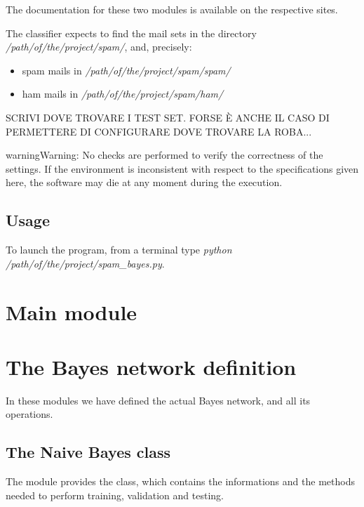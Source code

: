 \documentclass[letterpaper,10pt,english]{sphinxmanual}
\begin{document}
The documentation for these two modules is available on the respective sites.

The classifier expects to find the mail sets in the directory \emph{/path/of/the/project/spam/}, and, precisely:
\begin{itemize}
\item {} 
spam mails in \emph{/path/of/the/project/spam/spam/}

\item {} 
ham mails in \emph{/path/of/the/project/spam/ham/}

\end{itemize}

SCRIVI DOVE TROVARE I TEST SET. FORSE È ANCHE IL CASO DI PERMETTERE DI CONFIGURARE DOVE TROVARE LA ROBA...

\begin{notice}{warning}{Warning:}
No checks are performed to verify the correctness of the settings. If the environment is inconsistent with respect to the specifications given here, the software may die at any moment during the execution.
\end{notice}


\section{Usage}
\label{index:usage}
To launch the program, from a terminal type
\emph{python /path/of/the/project/spam\_bayes.py}.


\chapter{Main module}
\label{index:module-spam_bayes}\label{index:main-module}

\chapter{The Bayes network definition}
\label{index:the-bayes-network-definition}
In these modules we have defined the actual Bayes network, and all its operations.


\section{The Naive Bayes class}
\label{index:the-naive-bayes-class}
The {\hyperref[index:module-naive_bayes]{}} module provides the {\hyperref[index:naive_bayes.Bayes]{}} class, which contains the informations and the methods needed to perform training, validation and testing.
\end{document}
